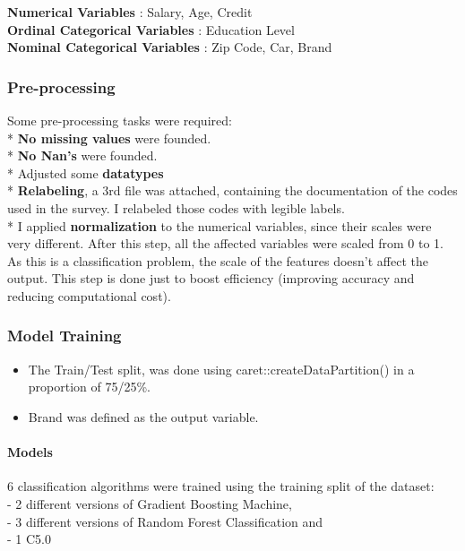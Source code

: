 \documentclass[
]{article}
\providecommand{\tightlist}{%
  \setlength{\itemsep}{0pt}\setlength{\parskip}{0pt}}
\begin{document}
\textbf{Numerical Variables} : Salary, Age, Credit\\
\textbf{Ordinal Categorical Variables} : Education Level\\
\textbf{Nominal Categorical Variables} : Zip Code, Car, Brand

\hypertarget{pre-processing}{%
\subsubsection{Pre-processing}\label{pre-processing}}

Some pre-processing tasks were required:\\
* \textbf{No missing values} were founded.\\
* \textbf{No Nan's} were founded.\\
* Adjusted some \textbf{datatypes}\\
* \textbf{Relabeling}, a 3rd file was attached, containing the
documentation of the codes used in the survey. I relabeled those codes
with legible labels.\\
* I applied \textbf{normalization} to the numerical variables, since
their scales were very different. After this step, all the affected
variables were scaled from 0 to 1. As this is a classification problem,
the scale of the features doesn't affect the output. This step is done
just to boost efficiency (improving accuracy and reducing computational
cost).

\hypertarget{model-training}{%
\subsubsection{Model Training}\label{model-training}}

\begin{itemize}
\tightlist
\item
  The Train/Test split, was done using caret::createDataPartition() in a
  proportion of 75/25\%.
\item
  Brand was defined as the output variable.
\end{itemize}

\hypertarget{models}{%
\paragraph{Models}\label{models}}

6 classification algorithms were trained using the training split of the
dataset:\\
- 2 different versions of Gradient Boosting Machine,\\
- 3 different versions of Random Forest Classification and\\
- 1 C5.0
\end{document}
